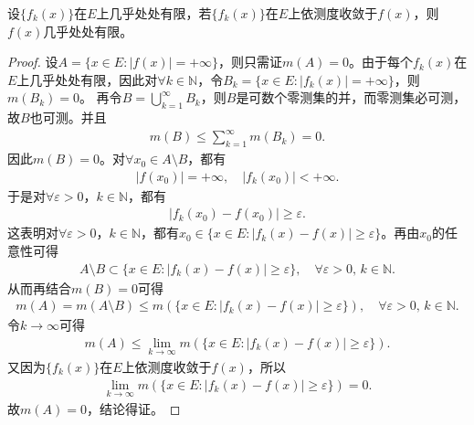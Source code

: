 \documentclass[../../main.tex]{subfiles}%
\begin{document}
\begin{theorem}\label{theorem:依测度收敛的极限函数必几乎处处有限}
设\(\{f_k(x)\}\)在\(E\)上几乎处处有限，若\(\{f_k(x)\}\)在\(E\)上依测度收敛于\(f(x)\)，则\(f(x)\)几乎处处有限。
\end{theorem}
\begin{proof}

设\(A = \{x \in E : |f(x)| = +\infty\}\)，则只需证\(m(A) = 0\)。由于每个\(f_k(x)\)在\(E\)上几乎处处有限，因此对\(\forall k \in \mathbb{N}\)，令\(B_k = \{x \in E : |f_k(x)| = +\infty\}\)，则\(m(B_k) = 0\)。
再令\(B = \bigcup_{k=1}^{\infty} B_k\)，则\(B\)是可数个零测集的并，而零测集必可测，故\(B\)也可测。并且
\begin{align*}
m(B) \leqslant \sum_{k=1}^{\infty} m(B_k) = 0.
\end{align*}
因此\(m(B) = 0\)。对\(\forall x_0 \in A \setminus B\)，都有
\begin{align*}
|f(x_0)| = +\infty, \quad |f_k(x_0)| < +\infty.
\end{align*}
于是对\(\forall \varepsilon > 0\)，\(k \in \mathbb{N}\)，都有
\begin{align*}
|f_k(x_0) - f(x_0)| \geqslant \varepsilon.
\end{align*}
这表明对\(\forall \varepsilon > 0\)，\(k \in \mathbb{N}\)，都有\(x_0 \in \{x \in E : |f_k(x) - f(x)| \geqslant \varepsilon\}\)。再由\(x_0\)的任意性可得
\begin{align*}
A \setminus B \subset \{x \in E : |f_k(x) - f(x)| \geqslant \varepsilon\}, \quad \forall \varepsilon > 0, \, k \in \mathbb{N}.
\end{align*}
从而再结合\(m(B) = 0\)可得
\begin{align*}
m(A) = m(A \setminus B) \leqslant m(\{x \in E : |f_k(x) - f(x)| \geqslant \varepsilon\}), \quad \forall \varepsilon > 0, \, k \in \mathbb{N}.
\end{align*}
令\(k \to \infty\)可得
\begin{align*}
m(A) \leqslant \lim_{k \to \infty} m(\{x \in E : |f_k(x) - f(x)| \geqslant \varepsilon\}).
\end{align*}
又因为\(\{f_k(x)\}\)在\(E\)上依测度收敛于\(f(x)\)，所以
\begin{align*}
\lim_{k \to \infty} m(\{x \in E : |f_k(x) - f(x)| \geqslant \varepsilon\}) = 0.
\end{align*}
故\(m(A) = 0\)，结论得证。

\end{proof}
\end{document}
